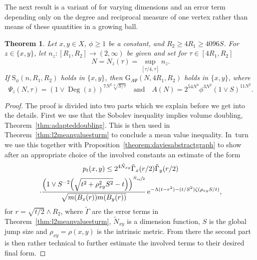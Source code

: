 \documentclass[JEP,XML,SOM,Unicode,published]{cedram}
\newcommand{\rG}{\mathrm{G}}
\newcommand{\rS}{\mathrm{S}}
\theoremstyle{plain}
\newtheorem{theorem}{Theorem}[section]
\theoremstyle{definition}
\newcommand{\euler}{\mathrm{e}}
\DeclareMathOperator{\Deg}{Deg}
\begin{document}
The next result is a variant of \cite[Th.\,6.1]{KellerRose-22a} for varying dimensions and an error term depending only on the degree and reciprocal measure of {one vertex} rather than means of these quantities in a growing ball.

\begin{theorem}\label{thm:main1sturm}
Let $x,y\in X$, $\phi\geq 1$ be a constant, and
$ R_2\geq 4R_1\geq 4096S$. For $z\in\{x,y\}$, let $ n_z\colon[R_1,R_2]\to(2,\infty) $ be given and set for $\tau\in [4R_1,R_2]$
\[
N=N_z(\tau)=\sup_{[\tau/4,\tau]}n_z.
\]
If $\rS_\phi(n,R_1,R_2)$ holds in $\{x,y\}$,
then $\rG_{A\Psi}(N,4R_1,R_2)$ holds in $\{x,y\}$,
where
\[
\Psi_z(N,\tau)=\left(1\vee \Deg(z)
\right)^{7N^2\sqrt[N]{S/\tau}}\quad\text{and}\quad
A(N)=2^{54N^3}\phi
^{3N^2}(1\vee S)^{11N^2}.
\]
\end{theorem}
\begin{proof}
The proof is divided into two parts which we explain before we get into the details. First we use that the Sobolev inequality implies volume doubling, Theorem~\ref{thm:adapteddoubling}. This is then used in Theorem~\ref{thm:l2meanvaluesturm} to conclude a mean value inequality. In~turn we use this together with Proposition~\ref{theorem:daviesabstractgraph} to show after an appropriate choice of the involved constants an estimate of the form
\begin{multline*}
p_{t}(x,y)
\leq 2^{4{\tilde N_{xy}}}
\tilde \Gamma_x(r/2)\tilde \Gamma_y(r/2)
\\
\cdot
\frac{
\left(1\vee {S^{-2}}{\left(\sqrt{t^2+\rho_{xy}^2S^2}-t\right)}\right)^{\sfrac{\tilde N_{xy}}{2}}}
{\sqrt{m(B_{x}(r))m(B_{y}(r))}}\,
\euler^{-\Lambda (t- r^2)-(t/S^2)\zeta(\rho_{xy}S/t)},
\end{multline*}
for $ r=\sqrt{t/2}\wedge R_{2} $, where $\tilde \Gamma $ are the error terms in Theorem~\ref{thm:l2meanvaluesturm}, $ \tilde N_{xy}$ is a dimension function, $S$ is the global jump size and $ \rho_{xy}=\rho(x,y) $ is the intrinsic metric. From there the second part is then rather technical to further estimate the involved terms to their desired final form.


\end{proof}
\end{document}

